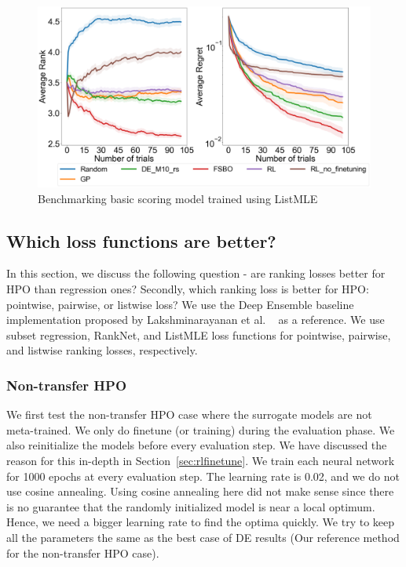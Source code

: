 \documentclass[12pt, twoside, ngerman]{report}
\begin{document}
\begin{figure}[h]
  \centering
    \includegraphics[scale=0.25]{images/RLEvaluationBasicScoring}
    \caption{Benchmarking basic scoring model trained using ListMLE}
    \label{fig:RLEvaluationBasicScoring}
\end{figure}
\fi

\subsection{Which loss functions are better?}

In this section, we discuss the following question - are ranking losses better for HPO than regression ones? Secondly, which ranking loss is better for HPO: pointwise,  pairwise, or listwise loss?
We use the Deep Ensemble baseline implementation proposed by Lakshminarayanan et al. ~\cite{DeepEnsemblePaper} as a reference. We use subset regression,  RankNet, and ListMLE loss functions for pointwise, pairwise, and listwise ranking losses, respectively. 

\subsubsection{Non-transfer HPO}
We first test the non-transfer HPO case where the surrogate models are not meta-trained. We only do finetune (or training) during the evaluation phase. We also reinitialize the models before every evaluation step. We have discussed the reason for this in-depth in Section~\ref{sec:rlfinetune}.
We train each neural network for 1000 epochs at every evaluation step. The learning rate is 0.02, and we do not use cosine annealing.
Using cosine annealing here did not make sense since there is no guarantee that the randomly initialized model is near a local optimum.
Hence, we need a bigger learning rate to find the optima quickly.
We try to keep all the parameters the same as the best case of DE results (Our reference method for the non-transfer HPO case).
\end{document}

